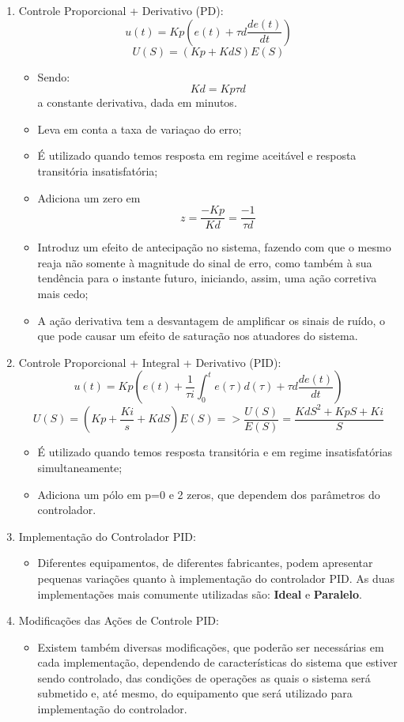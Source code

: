 \begin{enumerate}
    \item Controle Proporcional + Derivativo (PD):
        \[u(t)=Kp(e(t)+\tau d\frac{de(t)}{dt})\]
        \[U(S)=(Kp+KdS)E(S)\]
        \begin{itemize}
            \item Sendo: \[Kd=Kp\tau d\] a constante derivativa, dada em minutos.
            \item Leva em conta a taxa de variaçao do erro;
            \item É utilizado quando temos resposta em regime aceitável e resposta transitória insatisfatória;
            \item Adiciona um zero em \[z=\frac{-Kp}{Kd}=\frac{-1}{\tau d}\]
            \item Introduz um efeito de antecipação no sistema, fazendo com que o mesmo reaja não somente à magnitude do sinal de erro, como também à sua tendência para o instante futuro, iniciando, assim, uma ação corretiva mais cedo;
            \item A ação derivativa tem a desvantagem de amplificar os sinais de ruído, o que pode causar um efeito de saturação nos atuadores do sistema.
        \end{itemize}
        
    \item Controle Proporcional + Integral + Derivativo (PID):
        \[u(t)=Kp(e(t)+\frac{1}{\tau i}\int_{0}^{t}e(\tau)d(\tau)+\tau d\frac{de(t)}{dt})\]
        \[U(S)=(Kp+\frac{Ki}{s}+KdS)E(S) => \frac{U(S)}{E(S)}=\frac{KdS^2+KpS+Ki}{S}\]
        \begin{itemize}
                    \item É utilizado quando temos resposta transitória e em regime insatisfatórias simultaneamente;
            \item Adiciona um pólo em p=0 e 2 zeros, que dependem dos parâmetros do controlador.
        \end{itemize}
        
    \item Implementação do Controlador PID:
        \begin{itemize}
            \item Diferentes equipamentos, de diferentes fabricantes, podem apresentar pequenas variações quanto à implementação do controlador PID. As duas implementações mais comumente utilizadas são: \textbf{Ideal} e \textbf{Paralelo}.
        \end{itemize}
        
    \item Modificações das Ações de Controle PID:
        \begin{itemize}
            \item Existem também diversas modificações, que poderão ser necessárias em cada implementação, dependendo de características do sistema que estiver sendo controlado, das condições de operações as quais o sistema será submetido e, até mesmo, do equipamento que será utilizado para implementação do controlador.
        \end{itemize}
        

\end{enumerate}

